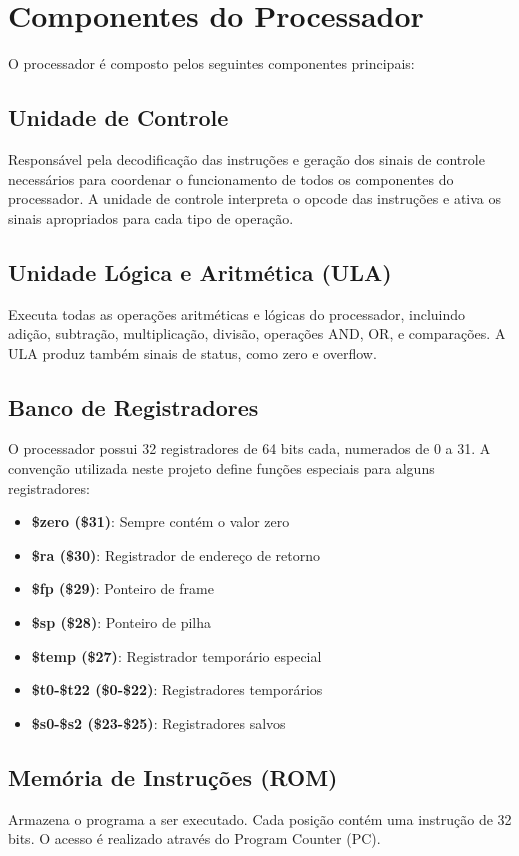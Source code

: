 \documentclass[
	12pt,				%
	oneside,
	a4paper,			%
	english,			%
	french,				%
	spanish,			%
	brazil,				%
	]{abntex2}
\begin{document}
\section{Componentes do Processador}

O processador é composto pelos seguintes componentes principais:

\subsection{Unidade de Controle}
Responsável pela decodificação das instruções e geração dos sinais de controle necessários para coordenar o funcionamento de todos os componentes do processador. A unidade de controle interpreta o opcode das instruções e ativa os sinais apropriados para cada tipo de operação.

\subsection{Unidade Lógica e Aritmética (ULA)}
Executa todas as operações aritméticas e lógicas do processador, incluindo adição, subtração, multiplicação, divisão, operações AND, OR, e comparações. A ULA produz também sinais de status, como zero e overflow.

\subsection{Banco de Registradores}
O processador possui 32 registradores de 64 bits cada, numerados de 0 a 31. A convenção utilizada neste projeto define funções especiais para alguns registradores:
\begin{itemize}
    \item \textbf{\$zero (\$31)}: Sempre contém o valor zero
    \item \textbf{\$ra (\$30)}: Registrador de endereço de retorno
    \item \textbf{\$fp (\$29)}: Ponteiro de frame
    \item \textbf{\$sp (\$28)}: Ponteiro de pilha  
    \item \textbf{\$temp (\$27)}: Registrador temporário especial
    \item \textbf{\$t0-\$t22 (\$0-\$22)}: Registradores temporários
    \item \textbf{\$s0-\$s2 (\$23-\$25)}: Registradores salvos
\end{itemize}

\subsection{Memória de Instruções (ROM)}
Armazena o programa a ser executado. Cada posição contém uma instrução de 32 bits. O acesso é realizado através do Program Counter (PC).
\end{document}
